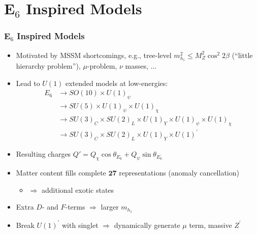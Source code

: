 \documentclass[10pt,aspectratio=169]{beamer}
\begin{document}
\section{E$_6$ Inspired Models}

\begin{frame}
  \frametitle{E$_6$ Inspired Models}
  \begin{itemize} \itemsep1em
    \item Motivated by MSSM shortcomings, e.g., tree-level $m_{h_1}^2
      \leq M_Z^2 \cos^2 2\beta$ (\alert{``little hierarchy problem''}),
      \alert{$\mu$-problem}, $\nu$ masses, $\ldots$
    \item Lead to $U(1)$ extended models at low-energies:
      \begin{align*}
        E_6&\longrightarrow SO(10)\times U(1)_\psi \\
        &\longrightarrow SU(5)\times U(1)_\psi\times U(1)_\chi\\
        &\longrightarrow SU(3)_C\times SU(2)_L\times U(1)_Y\times
        U(1)_\psi\times U(1)_\chi\\
        &\longrightarrow SU(3)_C\times SU(2)_L\times U(1)_Y\times
        U(1)^\prime
      \end{align*}
    \item Resulting charges $Q' = Q_\chi \cos \theta_{E_6}
      + Q_\psi \sin \theta_{E_6}$
    \item Matter content fills complete $\mathbf{27}$ representations
      (anomaly cancellation)
      \begin{itemize}
      \item $\Rightarrow$ additional exotic states
      \end{itemize}
    \item Extra $D$- and $F$-terms $\Rightarrow$ {\color{blue}
      larger $m_{h_1}$}
    \item Break $U(1)^\prime$ with singlet $\Rightarrow$ {\color{blue}
      dynamically generate $\mu$ term}, massive $Z^\prime$
  \end{itemize}
\end{frame}
\end{document}
